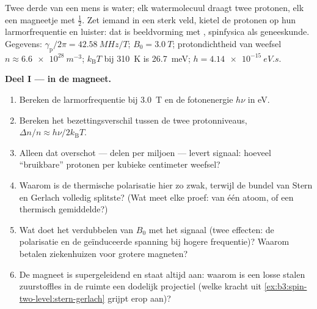 \begin{problem}\label{pb:b3:spin-two-level:1}
Twee derde van een mens is water; elk watermolecuul draagt twee protonen,
elk een magneetje met  $\tfrac12$. Zet iemand in een sterk veld, kietel
de protonen op hun larmorfrequentie en luister: dat is beeldvorming met
, spinfysica als geneeskunde. Gegevens:
$\gamma_{\text{p}}/2\pi = \qty{42.58}{MHz/T}$; $B_0 = \qty{3.0}{T}$;
protondichtheid van weefsel $n \approx \qty{6.6e28}{m^{-3}}$;
$k_{\text{B}}T$ bij \qty{310}{K} is \qty{26.7}{meV}; $h =
\qty{4.14e-15}{eV.s}$.

\medskip\noindent\textbf{Deel I ---  in de magneet.}
\begin{enumerate}
  \item Bereken de larmorfrequentie bij \qty{3.0}{T} en de fotonenergie
        $h\nu$ in eV.
  \item Bereken het bezettingsverschil tussen de twee protonniveaus,
        $\Delta n/n \approx h\nu/2k_{\text{B}}T$.
  \item Alleen dat overschot --- delen per miljoen --- levert signaal:
        hoeveel ``bruikbare'' protonen per kubieke centimeter weefsel?
  \item Waarom is de thermische polarisatie hier zo zwak, terwijl de
        bundel van Stern en Gerlach volledig splitste? (Wat meet elke
        proef:  van één atoom, of een thermisch gemiddelde?)
  \item Wat doet het verdubbelen van $B_0$ met het signaal (twee
        effecten: de polarisatie en de geïnduceerde spanning bij hogere
        frequentie)? Waarom betalen ziekenhuizen voor grotere magneten?
  \item De magneet is supergeleidend en staat altijd aan: waarom is een
        losse stalen zuurstoffles in de ruimte een dodelijk projectiel
        (welke kracht uit \cref{ex:b3:spin-two-level:stern-gerlach}
        grijpt erop aan)?
\end{enumerate}


\end{problem}
